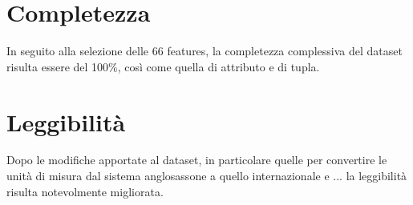\section{Completezza}
In seguito alla selezione delle 66 features, la completezza complessiva del 
dataset risulta essere del 100\%, così come quella di attributo e di tupla.

\section{Leggibilità}
Dopo le modifiche apportate al dataset, in particolare quelle per convertire le 
unità di misura dal sistema anglosassone a quello internazionale e ... la 
leggibilità risulta notevolmente migliorata.
